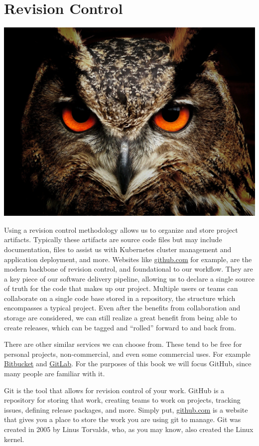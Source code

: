 \chapter{Revision Control}
\includegraphics[scale=0.20]{images/owl-50267_1920.jpg}

\justifying
Using a revision control methodology allows us to organize and store project artifacts. Typically these
artifacts are source code files but may include documentation, files to assist us with Kubernetes cluster management and application
deployment, and more. Websites like \href{https://github.com}{github.com} for example, are the modern
backbone of revision control, and foundational to our workflow. They are a key piece of our software delivery pipeline,
allowing us to declare a single source of truth for the code that makes up our project. Multiple users or teams can collaborate on a
single code base stored in a repository, the structure which encompasses a typical project. Even after the benefits from collaboration and
storage are considered, we can still realize a great benefit from being able to create releases, which can be tagged and ``rolled''
forward to and back from.

\justifying
There are other similar services we can choose from. These tend to be free for personal projects, non-commercial, and even some commercial
uses. For example \href{https://bitbucket.org/product}{Bitbucket} and \href{https://about.gitlab.com/}{GitLab}. For the purposes of this
book we will focus GitHub, since many people are familiar with it.

\justifying
Git is the tool that allows for revision control of your work. GitHub is a repository for storing that work, creating
teams to work on projects, tracking issues, defining release packages, and more. Simply put, \href{github.com}{github.com}
is a website that gives you a place to store the work you are using git to manage. Git was created in 2005 by
Linus Torvalds, who, as you may know, also created the Linux kernel.

